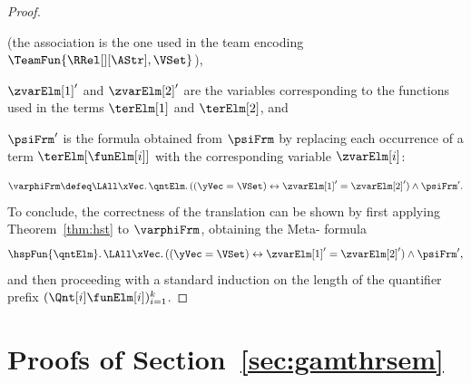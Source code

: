 \documentclass[authoryear]{elsarticle}
\begin{document}
\begin{proof}
\begin{inparaenum}[(1)]
      (the association is the one used in the team encoding
      $\TeamFun{\RRel[][\AStr], \VSet}$),
    \item
      $\zvarElm[1]'$ and $\zvarElm[2]'$ are the variables corresponding to the
      functions used in the terms $\terElm[1]$ and $\terElm[2]$, and
    \item
      $\psiFrm'$ is the \FOL formula obtained from $\psiFrm$ by replacing each
      occurrence of a term $\terElm[{\funElm[i]}]$ with the corresponding
      variable $\zvarElm[i]$:
  \end{inparaenum}
  \[
    \varphiFrm \defeq \LAll \xVec \ldotp \qntElm \ldotp ((\yVec = \VSet)
    \leftrightarrow \zvarElm[1]' = \zvarElm[2]') \wedge \psiFrm'.
  \]
  To conclude, the correctness of the translation can be shown by first
  applying Theorem~\ref{thm:hst} to $\varphiFrm$, obtaining the Meta-\ADF
  formula
  \[
    \hspFun{\qntElm} \ldotp \LAll \xVec \ldotp ((\yVec = \VSet)
    \leftrightarrow \zvarElm[1]' = \zvarElm[2]') \wedge \psiFrm',
  \]
  and then proceeding with a standard induction on the length of the quantifier
  prefix $(\Qnt[i] \funElm[i])_{i = 1}^{k}$.
\end{proof}







\section{Proofs of Section~\ref{sec:gamthrsem}}
\label{app:gamthrsem}
\end{document}
